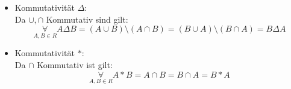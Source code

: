 \documentclass{article}
\begin{document}
\begin{enumerate}[(a)]
\begin{itemize}
\begin{align*}
                    &=\{x\in M|
                    (x\in A\land x\notin B\land x\notin C)\lor (x\notin A\land x\in B\land x\notin C)\\
                    &\lor(x\in A\land x\in B\land x\in C)\lor (x\notin A\land x\notin B\land x\in C)
                    \}\\
                    &=\{x\in M|
                    (x\in A\land x\in B\land x\in C)
                    \lor (x\in A\land x\notin B\land x\notin C)\\
                    &\lor (x\notin A\land x\in B\land x\notin C)
                    \lor (x\notin A\land x\notin B\land x\in C)
                    \}\\
                    &=\{x\in M|
                    [x\in A\land ((x\in B\land x\in C)
                    \lor (x\notin B\land x\notin C))]\\
                    &\lor
                    [x\notin A\land((x\in B\land x\notin C)
                    \lor(x\notin B\land x\in C))]
                    \}\\
                    &=\{x\in M|
                    [x\in A\land ((x\in B\land x\in C)
                    \lor (x\notin B\land x\notin C))]\\
                    &\lor
                    [x\notin A\land((x\in B\land x\notin C)
                    \lor(x\notin B\land x\in C))]
                    \}\\
                    &=\{x\in M|[x\in A\land (x\notin B\Delta C)]
                    \lor[x\notin A\land(x\in B\Delta C)]\}\\
                    &=A\Delta(B\Delta C)
                \end{align*}
            \item
                Kommutativität $\Delta$:\\
                Da $\cup,\cap$ Kommutativ sind gilt:
                \begin{equation*}
                    \underset{A,B\in R}\forall A\Delta B=(A\cup B)\setminus(A\cap B)=(B\cup A)\setminus(B\cap A)=B\Delta A
                \end{equation*}
            \item
                Kommutativität $*$:\\
                Da $\cap$ Kommutativ ist gilt:
                \begin{equation*}
                    \underset{A,B\in R}\forall A*B=A\cap B=B\cap A=B*A
                \end{equation*}

\end{itemize}
\end{enumerate}
\end{document}
